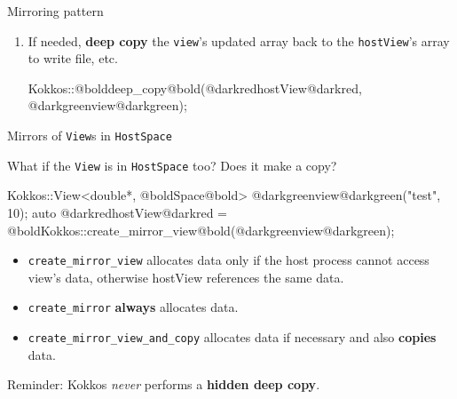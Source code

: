\begin{frame}[fragile]{Mirroring pattern}
\begin{enumerate}
{  }
    \item<+->{If needed, \textbf{deep copy} the {\color{darkgreen}\texttt{view}}'s updated array back to the {\color{darkred}\texttt{hostView}}'s array to write file, etc. \\

      \vspace{-5pt}
      \begin{code}[keywords={}]
  Kokkos::@bolddeep_copy@bold(@darkredhostView@darkred, @darkgreenview@darkgreen);
      \end{code}
      \vspace{-4pt}

  }
  \end{enumerate}

\end{frame}


\begin{frame}[fragile]{Mirrors of \texttt{View}s in \texttt{HostSpace}}

  What if the \texttt{View} is in \texttt{HostSpace} too?  Does it make a copy?

  \begin{code}[keywords={}]
Kokkos::View<double*, @boldSpace@bold> @darkgreenview@darkgreen("test", 10);
auto @darkredhostView@darkred = @boldKokkos::create_mirror_view@bold(@darkgreenview@darkgreen);
  \end{code}

  \begin{itemize}
    \item{\texttt{create\_mirror\_view} allocates data only if the host process cannot access {\color{darkgreen}view}'s data, otherwise {\color{darkred}hostView} references the same data.}
    \item{\texttt{create\_mirror} \textbf{always} allocates data.}
    \item{\texttt{create\_mirror\_view\_and\_copy} allocates data if necessary and also \textbf{copies} data.}
  \end{itemize}

  Reminder: Kokkos \emph{never} performs a \textbf{hidden deep copy}.

  \vspace{-5pt}

\end{frame}


